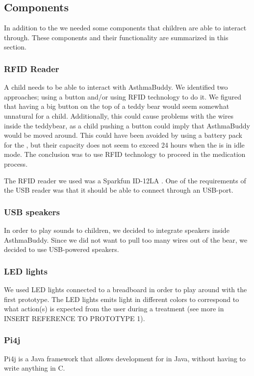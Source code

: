   
\subsection{Components}
In addition to the \rpi{} we needed some components that children are able to interact through. These components and their functionality are summarized in this section. 


\subsubsection{RFID Reader}
A child needs to be able to interact with AsthmaBuddy. We identified two approaches; using a button and/or using RFID technology to do it. We figured that having a big button on the top of a teddy bear would seem somewhat unnatural for a child. Additionally, this could cause problems with the wires inside the teddybear, as a child pushing a button could imply that AsthmaBuddy would be moved around. This could have been avoided by using a battery pack for the \rpi{}, but their capacity does not seem to exceed 24 hours when the \rpi{} is in idle mode. The conclusion was to use RFID technology to proceed in the medication process.


The RFID reader we used was a Sparkfun ID-12LA . One of the requirements of the USB reader was that it should be able to connect through an USB-port. 
         
\subsubsection{USB speakers}
In order to play sounds to children, we decided to integrate speakers inside AsthmaBuddy. Since we did not want to pull too many wires out of the bear, we decided to use USB-powered speakers.    

\subsubsection{LED lights}
We used LED lights connected to a breadboard in order to play around with the first prototype. The LED lights emits light in different colors to correspond to what action(s) is expected from the user during a treatment (see more in INSERT REFERENCE TO PROTOTYPE 1).

\subsubsection{Pi4j}
Pi4j is a Java framework that allows development for \rpi{} in Java, without having to write anything in C. 

